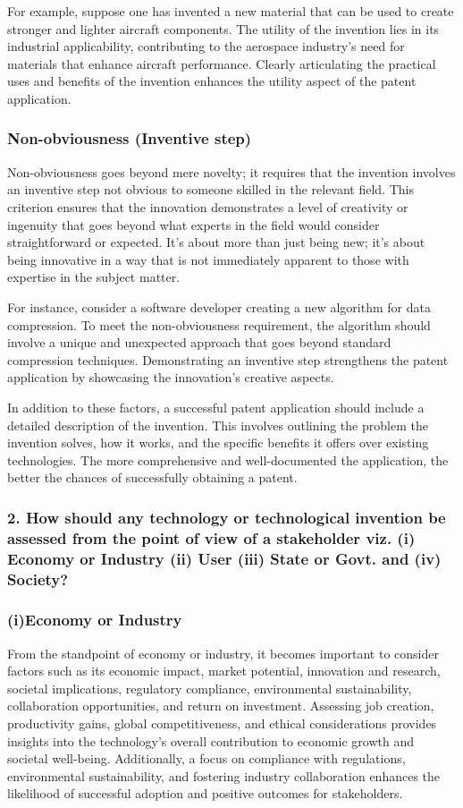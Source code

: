 \documentclass{report}
\begin{document}
For example, suppose one has invented a new material that can be used to create stronger and lighter aircraft 
components. The utility of the invention lies in its industrial applicability, contributing to the aerospace 
industry's need for materials that enhance aircraft performance. Clearly articulating the practical uses and 
benefits of the invention enhances the utility aspect of the patent application.

\subsubsection*{Non-obviousness (Inventive step)}
Non-obviousness goes beyond mere novelty; it requires that the invention involves an inventive step not 
obvious to someone skilled in the relevant field. This criterion ensures that the innovation demonstrates 
a level of creativity or ingenuity that goes beyond what experts in the field would consider straightforward 
or expected. It's about more than just being new; it's about being innovative in a way that is not 
immediately apparent to those with expertise in the subject matter.

For instance, consider a software developer creating a new algorithm for data compression. To meet the 
non-obviousness requirement, the algorithm should involve a unique and unexpected approach that goes beyond 
standard compression techniques. Demonstrating an inventive step strengthens the patent application by 
showcasing the innovation's creative aspects.


In addition to these factors, a successful patent application should include a detailed description of the invention. 
This involves outlining the problem the invention solves, how it works, and the specific benefits it offers over 
existing technologies. The more comprehensive and well-documented the application, the better the chances of successfully obtaining a patent.


\subsubsection*{2. How should any technology or technological invention be
assessed from the point of view of a stakeholder viz. (i) Economy
or Industry (ii) User (iii) State or Govt. and (iv) Society?}


\subsubsection*{\textbf{(i)Economy or Industry}}
From the standpoint of economy or industry, it becomes important to consider factors such as 
its economic impact, market potential, innovation and research, societal implications, regulatory 
compliance, environmental sustainability, collaboration opportunities, and return on investment. 
Assessing job creation, productivity gains, global competitiveness, and ethical considerations 
provides insights into the technology's overall contribution to economic growth and societal 
well-being. Additionally, a focus on compliance with regulations, environmental sustainability, 
and fostering industry collaboration enhances the likelihood of successful adoption and positive outcomes for stakeholders.
\end{document}
